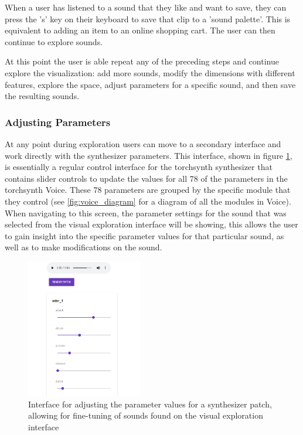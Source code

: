 When a user has listened to a sound that they like and want to save, they can press the 's' key on their keyboard to save that clip to a 'sound palette'. This is equivalent to adding an item to an online shopping cart. The user can then continue to explore sounds.

At this point the user is able repeat any of the preceding steps and continue explore the visualization: add more sounds, modify the dimensions with different features, explore the space, adjust parameters for a specific sound, and then save the resulting sounds.

\subsubsection{Adjusting Parameters}
At any point during exploration users can move to a secondary interface and work directly with the synthesizer parameters. This interface, shown in figure \ref{fig:adjusting-parameters}, is essentially a regular control interface for the torchsynth synthesizer that contains slider controls to update the values for all 78 of the parameters in the torchsynth Voice. These 78 parameters are grouped by the specific module that they control (see \ref{fig:voice_diagram} for a diagram of all the modules in Voice). When navigating to this screen, the parameter settings for the sound that was selected from the visual exploration interface will be showing, this allows the user to gain insight into the specific parameter values for that particular sound, as well as to make modifications on the sound.

\begin{figure}[ht]
    \centering
    \includegraphics[width=0.45\textwidth]{figures/synthexplore/SynthExplore-Adjust-Param-Cropped.png}
    \caption{Interface for adjusting the parameter values for a synthesizer patch, allowing for fine-tuning of sounds found on the visual exploration interface }
    \label{fig:adjusting-parameters}
\end{figure}

